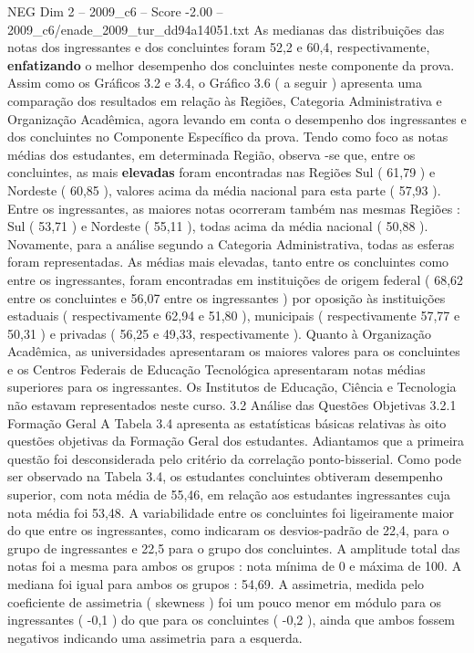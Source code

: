 \begin{textsample}{NEG Dim 2 – 2009\_c6 – Score -2.00 – 2009\_c6/enade\_2009\_tur\_dd94a14051.txt}
As medianas das distribuições das notas dos ingressantes e dos concluintes foram 52,2 e 60,4, respectivamente, \textbf{enfatizando} o melhor desempenho dos concluintes neste componente da prova.
Assim como os Gráficos 3.2 e 3.4, o Gráfico 3.6 ( a seguir ) apresenta uma comparação dos resultados em relação às Regiões, Categoria Administrativa e Organização Acadêmica, agora levando em conta o desempenho dos ingressantes e dos concluintes no Componente Específico da prova.
Tendo como foco as notas médias dos estudantes, em determinada Região, observa -se que, entre os concluintes, as mais \textbf{elevadas} foram encontradas nas Regiões Sul ( 61,79 ) e Nordeste ( 60,85 ), valores acima da média nacional para esta parte ( 57,93 ).
Entre os ingressantes, as maiores notas ocorreram também nas mesmas Regiões : Sul ( 53,71 ) e Nordeste ( 55,11 ), todas acima da média nacional ( 50,88 ).
Novamente, para a análise segundo a Categoria Administrativa, todas as esferas foram representadas.
As médias mais elevadas, tanto entre os concluintes como entre os ingressantes, foram encontradas em instituições de origem federal ( 68,62 entre os concluintes e 56,07 entre os ingressantes ) por oposição às instituições estaduais ( respectivamente 62,94 e 51,80 ), municipais ( respectivamente 57,77 e 50,31 ) e privadas ( 56,25 e 49,33, respectivamente ).
Quanto à Organização Acadêmica, as universidades apresentaram os maiores valores para os concluintes e os Centros Federais de Educação Tecnológica apresentaram notas médias superiores para os ingressantes.
Os Institutos de Educação, Ciência e Tecnologia não estavam representados neste curso. 3.2 Análise das Questões Objetivas 3.2.1 Formação Geral A Tabela 3.4 apresenta as estatísticas básicas relativas às oito questões objetivas da Formação Geral dos estudantes.
Adiantamos que a primeira questão foi desconsiderada pelo critério da correlação ponto-bisserial.
Como pode ser observado na Tabela 3.4, os estudantes concluintes obtiveram desempenho superior, com nota média de 55,46, em relação aos estudantes ingressantes cuja nota média foi 53,48.
A variabilidade entre os concluintes foi ligeiramente maior do que entre os ingressantes, como indicaram os desvios-padrão de 22,4, para o grupo de ingressantes e 22,5 para o grupo dos concluintes.
A amplitude total das notas foi a mesma para ambos os grupos : nota mínima de 0 e máxima de 100.
A mediana foi igual para ambos os grupos : 54,69.
A assimetria, medida pelo coeficiente de assimetria ( skewness ) foi um pouco menor em módulo para os ingressantes ( -0,1 ) do que para os concluintes ( -0,2 ), ainda que ambos fossem negativos indicando uma assimetria para a esquerda.

\end{textsample}
